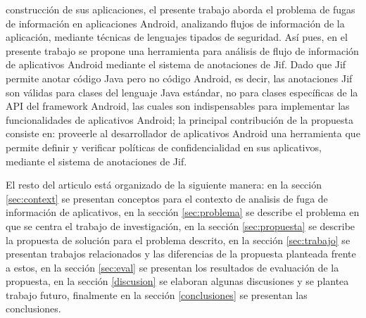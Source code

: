 construcción de sus aplicaciones, el presente trabajo aborda el problema de
fugas de información en aplicaciones Android, analizando flujos de información
de la aplicación, mediante técnicas de lenguajes tipados de seguridad.\newline
Así pues, en el presente trabajo se propone una herramienta para análisis de
flujo de información de aplicativos Android mediante el sistema de anotaciones
de Jif.\newline
Dado que Jif permite
anotar código Java pero no código Android, es decir, las anotaciones Jif son
válidas para clases del lenguaje Java estándar, no para clases específicas de la
API del framework Android, las cuales son indispensables para
implementar las funcionalidades de aplicativos Android; la principal
contribución de la propuesta consiste en: proveerle al desarrollador de
aplicativos Android una herramienta que permite definir y verificar políticas de
confidencialidad en sus aplicativos, mediante el sistema de anotaciones de
Jif.\newline

El resto del articulo está organizado de la siguiente manera: en la sección
\ref{sec:context} se presentan conceptos para el contexto de analisis
de fuga de información de aplicativos, en la sección \ref{sec:problema} se
describe el problema en que se centra el trabajo de investigación, en la sección
\ref{sec:propuesta} se describe la propuesta de solución para el problema
descrito, en la sección \ref{sec:trabajo} se presentan trabajos relacionados y
las diferencias de la propuesta planteada frente a estos, en la sección
\ref{sec:eval} se presentan los resultados de evaluación de la propuesta, en la
sección \ref{discusion} se elaboran algunas discusiones y se plantea trabajo
futuro, finalmente en la sección \ref{conclusiones} se presentan las
conclusiones.

